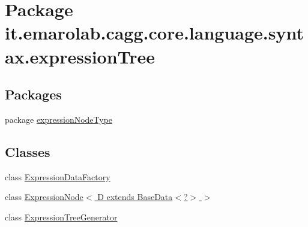 \hypertarget{namespaceit_1_1emarolab_1_1cagg_1_1core_1_1language_1_1syntax_1_1expressionTree}{\section{Package it.\-emarolab.\-cagg.\-core.\-language.\-syntax.\-expression\-Tree}
\label{namespaceit_1_1emarolab_1_1cagg_1_1core_1_1language_1_1syntax_1_1expressionTree}
}
\subsection*{Packages}
\begin{DoxyCompactItemize}
\item 
package \hyperlink{namespaceit_1_1emarolab_1_1cagg_1_1core_1_1language_1_1syntax_1_1expressionTree_1_1expressionNodeType}{expression\-Node\-Type}
\end{DoxyCompactItemize}
\subsection*{Classes}
\begin{DoxyCompactItemize}
\item 
class \hyperlink{classit_1_1emarolab_1_1cagg_1_1core_1_1language_1_1syntax_1_1expressionTree_1_1ExpressionDataFactory}{Expression\-Data\-Factory}
\item 
class \hyperlink{classit_1_1emarolab_1_1cagg_1_1core_1_1language_1_1syntax_1_1expressionTree_1_1ExpressionNode_3_3eaf7c0f6a4bc47f4823e05ca883c5af}{Expression\-Node$<$ D extends Base\-Data$<$?$>$ $>$}
\item 
class \hyperlink{classit_1_1emarolab_1_1cagg_1_1core_1_1language_1_1syntax_1_1expressionTree_1_1ExpressionTreeGenerator}{Expression\-Tree\-Generator}
\end{DoxyCompactItemize}
